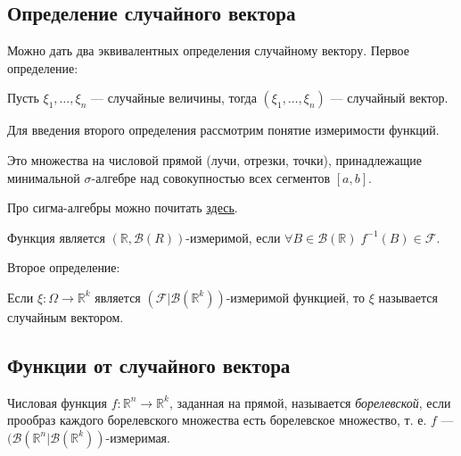 \subsection{Определение случайного вектора}

Можно дать два эквивалентных определения случайному вектору. Первое определение:

\begin{definition}
    Пусть $\xi_1, \ldots, \xi_n$ --- случайные величины, тогда $(\xi_1, \ldots, \xi_n)$ --- случайный вектор.
\end{definition}

Для введения второго определения рассмотрим понятие измеримости функций.

\begin{definition}
    Это множества на числовой прямой (лучи, отрезки, точки), принадлежащие минимальной $\sigma$-алгебре над совокупностью всех сегментов $[a,b]$.
\end{definition}

Про сигма-алгебры можно почитать \href{https://tvims.nsu.ru/chernova/tv/lec/node9.html}{здесь}.

\begin{definition}[измеримость]
    Функция является $(\mathbb{R}, \mathcal{B}(R))$-измеримой, если 
    \begin{math}
        \forall B \in \mathcal{B} (\mathbb{R} ) \; f^{-1}(B) \in \mathcal{F}.
    \end{math}
\end{definition}

Второе определение:

\begin{definition}
    Если $\xi: \Omega \rightarrow \mathbb{R}^k$ является $(\mathcal{F} | \mathcal{B} (\mathbb{R} ^k))$-измеримой функцией, то $\xi$ называется случайным вектором. 
\end{definition}

\subsection{Функции от случайного вектора}

\begin{definition}
    Числовая функция $f: \mathbb{R}^n \rightarrow \mathbb{R}^k$, заданная на прямой, называется \textit{борелевской}, если прообраз каждого борелевского множества есть борелевское множество, т. е. $f$ --- $(\mathcal{B} (\mathbb{R}^n | \mathcal{B} (\mathbb{R}^k))$-измеримая.
\end{definition}

